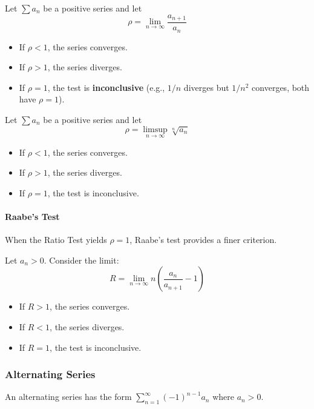 \begin{theorem}
Let $\sum a_n$ be a positive series and let
\[ \rho = \lim_{n \to \infty} \frac{a_{n+1}}{a_n} \]
\begin{itemize}
    \item If $\rho < 1$, the series converges.
    \item If $\rho > 1$, the series diverges.
    \item If $\rho = 1$, the test is \textbf{inconclusive} (e.g., $1/n$ diverges but $1/n^2$ converges, both have $\rho=1$).
\end{itemize}
\end{theorem}

\begin{theorem}
Let $\sum a_n$ be a positive series and let
\[ \rho = \limsup_{n \to \infty} \sqrt[n]{a_n} \]
\begin{itemize}
    \item If $\rho < 1$, the series converges.
    \item If $\rho > 1$, the series diverges.
    \item If $\rho = 1$, the test is inconclusive.
\end{itemize}
\end{theorem}

\paragraph{Raabe's Test}
When the Ratio Test yields $\rho = 1$, Raabe's test provides a finer criterion.

\begin{theorem}
Let $a_n > 0$. Consider the limit:
\[ R = \lim_{n \to \infty} n \left( \frac{a_n}{a_{n+1}} - 1 \right) \]
\begin{itemize}
    \item If $R > 1$, the series converges.
    \item If $R < 1$, the series diverges.
    \item If $R = 1$, the test is inconclusive.
\end{itemize}
\end{theorem}

\subsubsection{Alternating Series}
An alternating series has the form $\sum_{n=1}^{\infty} (-1)^{n-1} a_n$ where $a_n > 0$.

